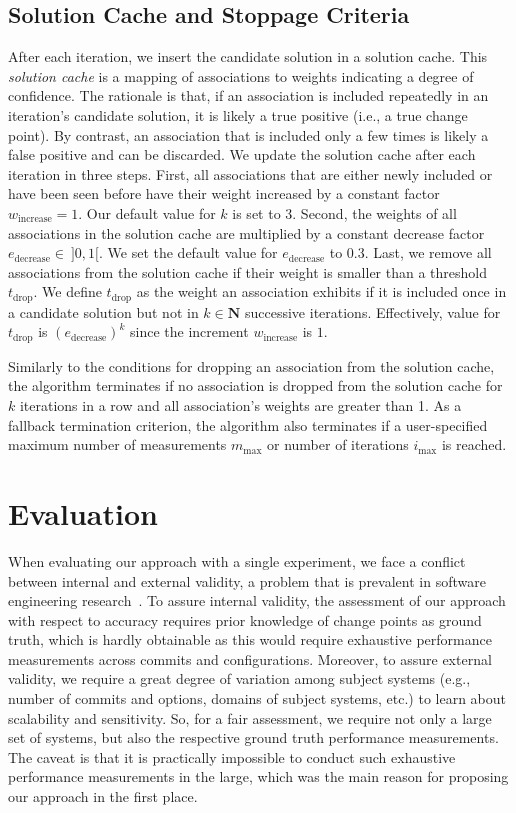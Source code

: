 \documentclass[sigconf]{acmart}
\begin{document}
	\subsection{Solution Cache and Stoppage Criteria}\label{sec:solutioncache}
	After each iteration, we insert the candidate solution in a solution cache. This \textit{solution cache} is a mapping of associations to weights indicating a degree of confidence. 
	The rationale is that, if an association is included repeatedly in an iteration's candidate solution, it is likely a true positive (i.e., a true change point). 
	By contrast, an association that is included only a few times is likely a false positive and can be discarded. 
	We update the solution cache after each iteration in three steps. 
	First, all associations that are either newly included or have been seen before have their weight increased by a constant factor $w_\text{increase} = 1$. Our default value for $k$ is set to 3.
	Second, the weights of all associations in the solution cache are multiplied by a constant decrease factor $e_\text{decrease}\in~\rbrack 0,1 \lbrack$. We set the default value for $e_\text{decrease}$ to 0.3.
	Last, we remove all associations from the solution cache if their weight is smaller than a threshold $t_\text{drop}$. We define $t_\text{drop}$ as the weight an association exhibits if it is included once in a candidate solution but not in $k \in \mathbf{N}$ successive iterations. Effectively, value for $t_\text{drop}$ is $({e_\text{decrease}})^k$ since the increment $w_\text{increase}$ is $1$.
	
	Similarly to the conditions for dropping an association from the solution cache, the algorithm terminates if no association is dropped from the solution cache for $k$ iterations in a row and all association's weights are greater than 1. As a fallback termination criterion, the algorithm also terminates if a user-specified maximum number of measurements $m_\text{max}$ or number of iterations $i_\text{max}$ is reached. 
	
	\section{Evaluation}
	When evaluating our approach with a single experiment, we face a conflict between internal and external validity, a problem that is prevalent in software engineering research~\cite{siegmund_views_2015}. 
	To assure internal validity, the assessment of our approach with respect to accuracy requires prior knowledge of change points as ground truth, which is hardly obtainable as this would require exhaustive performance measurements across commits and configurations. Moreover, to assure  external validity, we require a great degree of variation among subject systems (e.g., number of commits and options, domains of subject systems, etc.) to learn about scalability and sensitivity. 
	So, for a fair assessment, we require not only a large set of systems, but also the respective ground truth performance measurements. The caveat is that it is practically impossible to conduct such exhaustive performance measurements in the large, which was the main reason for proposing our approach in the first place.
	
\end{document}
